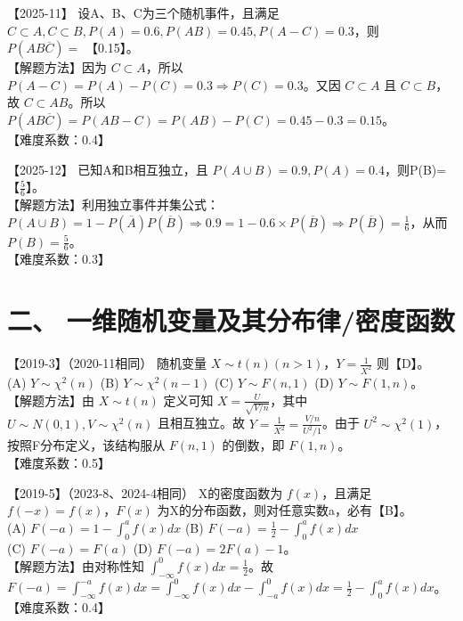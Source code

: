 \documentclass[zihao=4, a4paper, fontset=mac]{ctexart}
\begin{document}
\par\vspace{\baselineskip}

【2025-11】 设A、B、C为三个随机事件，且满足 $C\subset A, C\subset B, P(A)=0.6, P(AB)=0.45, P(A-C)=0.3$，则 $P(AB\overline{C})=$ 【0.15】。\\
【解题方法】因为 $C\subset A$，所以 $P(A-C)=P(A)-P(C)=0.3 \Rightarrow P(C)=0.3$。又因 $C\subset A$ 且 $C\subset B$，故 $C\subset AB$。所以 $P(AB\overline{C})=P(AB-C)=P(AB)-P(C)=0.45-0.3=0.15$。\\
【难度系数：0.4】

\par\vspace{\baselineskip}

【2025-12】 已知A和B相互独立，且 $P(A\cup B)=0.9, P(A)=0.4$，则P(B)=【$\frac{5}{6}$】。\\
【解题方法】利用独立事件并集公式：$P(A\cup B)=1-P(\overline{A})P(\overline{B}) \Rightarrow 0.9 = 1 - 0.6\times P(\overline{B}) \Rightarrow P(\overline{B})=\frac{1}{6}$，从而 $P(B)=\frac{5}{6}$。\\
【难度系数：0.3】


\section*{二、 一维随机变量及其分布律/密度函数}

【2019-3】（2020-11相同） 随机变量 $X\sim t(n)(n>1)$，$Y=\frac{1}{X^2}$ 则【D】。\\
(A) $Y\sim\chi^2(n)$ \quad (B) $Y\sim\chi^2(n-1)$ \quad (C) $Y\sim F(n,1)$ \quad (D) $Y\sim F(1,n)$。\\
【解题方法】由 $X\sim t(n)$ 定义可知 $X=\frac{U}{\sqrt{V/n}}$，其中 $U\sim N(0,1), V\sim \chi^2(n)$ 且相互独立。故 $Y=\frac{1}{X^2}=\frac{V/n}{U^2/1}$。由于 $U^2 \sim \chi^2(1)$，按照F分布定义，该结构服从 $F(n,1)$ 的倒数，即 $F(1,n)$。\\
【难度系数：0.5】

\par\vspace{\baselineskip}

【2019-5】（2023-8、2024-4相同） X的密度函数为 $f(x)$，且满足 $f(-x)=f(x)$，$F(x)$ 为X的分布函数，则对任意实数a，必有【B】。\\
(A) $F(-a)=1-\int_0^a f(x)dx$ \quad (B) $F(-a)=\frac{1}{2}-\int_0^a f(x)dx$ \\
(C) $F(-a)=F(a)$ \quad (D) $F(-a)=2F(a)-1$。\\
【解题方法】由对称性知 $\int_{-\infty}^0 f(x)dx = \frac{1}{2}$。故 $F(-a)=\int_{-\infty}^{-a} f(x)dx = \int_{-\infty}^0 f(x)dx - \int_{-a}^0 f(x)dx = \frac{1}{2}-\int_0^a f(x)dx$。\\
【难度系数：0.4】
\end{document}
